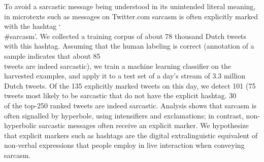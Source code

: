To avoid a sarcastic message being understood in its unintended literal meaning, in microtexts such as messages on Twitter.com sarcasm is often
 explicitly marked with the hashtag `\\#sarcasm'. We collected a training corpus
 of about 78 thousand Dutch tweets with this hashtag. Assuming that the human
 labeling is correct (annotation of a sample indicates that about 85\\%
 tweets are indeed sarcastic), we train a machine learning classifier on the
 harvested examples, and apply it to a test set of a day's stream of 3.3 million
 Dutch tweets. Of the 135 explicitly marked tweets on this day, we detect 101
 (75\\%
 tweets most likely to be sarcastic that do not have the explicit hashtag. 30\\%
 of the top-250 ranked tweets are indeed sarcastic. Analysis shows that sarcasm
 is often signalled by hyperbole, using intensifiers and exclamations; in
 contrast, non-hyperbolic sarcastic messages often receive an explicit marker.
 We hypothesize that explicit markers such as hashtags are the digital
 extralinguistic equivalent of non-verbal expressions that people employ in live
 interaction when conveying sarcasm.

